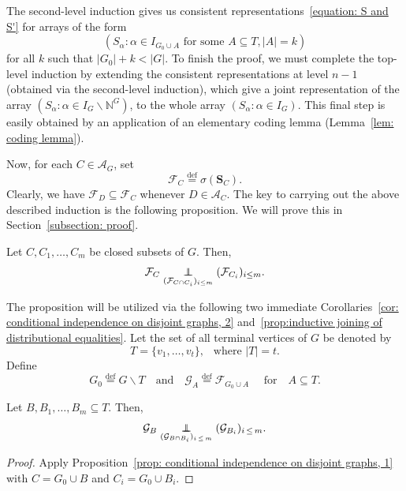 \documentclass[AHL,Unicode,longabstracts,published]{cedram}
\newcommand{\independent}{\protect\mathpalette{\protect\independenT}{\perp}}\def\independenT#1#2{\mathrel{\rlap{$#1#2$}\mkern2mu{#1#2}}}
\newcommand{\alf}{\alpha}%
\newcommand*{\defeq}{\stackrel{\mathrm{def}}{=}}
\newcommand*\N{\mathbb{N}}
\renewcommand{\AA}{\mathcal{A}}
\newcommand*\FF{\mathcal{F}}
\newcommand*\GG{\mathcal{G}}
\newcommand*\bS{\mathbf{S}}
\newcommand*\N{\mathbb{N}}
\begin{document}
The second-level induction gives us consistent representations~\eqref{equation: S and S'} for arrays of the form
\[
\left(S_\alpha : \alpha \in I_{G_0 \cup A} \text{ for some } A \subseteq T, |A|=k\right)
\]
for all $k$ such that $|G_0|+k<|G|$.
To finish the proof, we must complete the top-level induction by extending the consistent representations at level $n-1$ (obtained via the second-level induction), which give a joint representation of the array $(S_\alpha : \alpha \in I_G \backslash \N^G)$, to the whole array $(S_\alf : \alpha \in I_G)$. This final step is easily obtained by an application of an elementary coding lemma (Lemma~\ref{lem: coding lemma}).

Now, for each $C \in \AA_G$, set
\begin{equation*}
\mathcal{F}_C
\defeq \sigma(\bS_C).
\end{equation*}
Clearly, we have $\mathcal{F}_D \subseteq \mathcal{F}_C$ whenever $D \in \AA_C$. The key to carrying out the above described induction is the following proposition. We will prove this in Section~\ref{subsection: proof}.
\goodbreak

\begin{prop}\label{prop: conditional independence on disjoint graphs, 1}
Let $C, C_1,\ldots,C_m$ be closed subsets of $G$.
Then,
\[
\FF_C \underset{(\FF_{C \cap C_i})_{i \leq m}}{\independent} (\FF_{C_i})_{i\leq m}.
\]
\end{prop}

The proposition will be utilized via the following two immediate Corollaries~\ref{cor: conditional independence on disjoint graphs, 2} and~\ref{prop:inductive joining of distributional equalities}. Let the set of all terminal vertices of $G$ be denoted by
\begin{equation}\label{eqn:notation:T-t}
T=\{v_1,\ldots,v_t\},\ \ \text{ where }|T|=t.
\end{equation}
Define
\begin{equation}\label{eqn:notation:G0-GGA}
G_0
\defeq G \backslash T
\quad\text{and}\quad
\GG_A
\defeq \FF_{G_0 \cup A}
\quad\text{ for}\quad A \subseteq T.
\end{equation}

\begin{coro}\label{cor: conditional independence on disjoint graphs, 2}
Let $B, B_1,\ldots,B_m \subseteq T$. Then,
\[
\GG_B \underset{(\GG_{B \cap B_i})_{i\,\leq\,m}}{\independent} (\GG_{B_i})_{i\,\leq\,m}.
\]
\end{coro}
\begin{proof}
Apply Proposition~\ref{prop: conditional independence on disjoint graphs, 1} with $C = G_0 \cup B$ and $C_i=G_0 \cup B_i$.
\end{proof}
\end{document}
